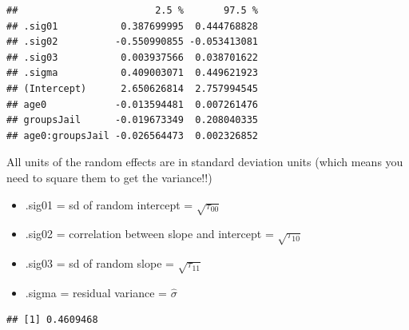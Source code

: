 \begin{frame}[fragile]

\footnotesize

\begin{Shaded}
\begin{Highlighting}[]
 \NormalTok{, } \NormalTok{)}
\end{Highlighting}
\end{Shaded}

\begin{verbatim}
##                        2.5 %       97.5 %
## .sig01           0.387699995  0.444768828
## .sig02          -0.550990855 -0.053413081
## .sig03           0.003937566  0.038701622
## .sigma           0.409003071  0.449621923
## (Intercept)      2.650626814  2.757994545
## age0            -0.013594481  0.007261476
## groupsJail      -0.019673349  0.208040335
## age0:groupsJail -0.026564473  0.002326852
\end{verbatim}

All units of the random effects are in standard deviation units (which
means you need to square them to get the variance!!)\\

\begin{itemize}
  \item .sig01 = sd of random intercept = $\sqrt{\tau_{00}}$  
  \item .sig02 = correlation between slope and intercept = $\sqrt{\tau_{10}}$  
  \item .sig03 = sd of random slope = $\sqrt{\tau_{11}}$  
  \item .sigma = residual variance = $\hat{\sigma}$  
\end{itemize}

\end{frame}

\begin{frame}[fragile]

\small

\begin{Shaded}
\begin{Highlighting}[]
\OperatorTok{::}
\end{Highlighting}
\end{Shaded}

\begin{verbatim}
## [1] 0.4609468
\end{verbatim}

\end{frame}

